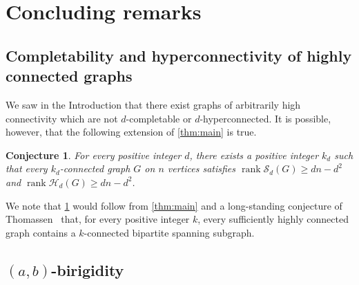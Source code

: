 \documentclass[11pt,a4paper,dvipsnames]{scrartcl}
\newtheorem{conjecture}[theorem]{Conjecture}
\newcommand{\cS}{{\mathcal{S}}}
\newcommand{\cH}{{\mathcal{H}}}
\newcommand{\locallycompletable}[1]{$d$-completable}
\DeclareMathOperator{\rank}{rank}
\begin{document}
\section{Concluding remarks}\label{section:concluding}

\subsection{Completability and hyperconnectivity of highly connected graphs}

We saw in the Introduction that there exist graphs of arbitrarily high connectivity which are not  \locallycompletable{d} or $d$-hyperconnected.  It is possible, however, that the following extension of \cref{thm:main} is true.

\begin{conjecture}\label{conjecture:completabilityLovaszYemini}
    For every positive integer $d$, there exists a positive integer $k_d$ such that every $k_d$-connected graph $G$ on $n$ vertices satisfies $\rank \cS_d(G)  \geq dn - d^2$ and $\rank \cH_d(G)  \geq dn - d^2$.
\end{conjecture}

We note that \cref{conjecture:completabilityLovaszYemini} would follow from \cref{thm:main} and a long-standing conjecture of Thomassen~\cite{thomassen_1989} that, for every positive integer $k$, every sufficiently highly connected graph contains a $k$-connected bipartite spanning subgraph.

\subsection{\texorpdfstring{\boldmath $(a,b)$}{(a,b)}-birigidity}\label{subsection:concludingbipartite}
\end{document}

